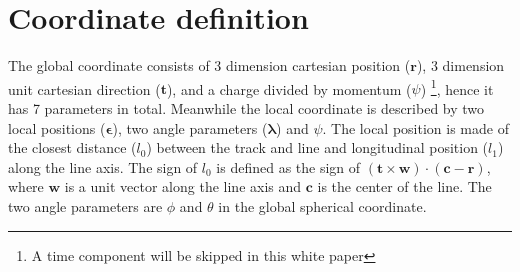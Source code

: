 \documentclass[12pt,a4paper]{scrarticle}
\begin{document}
\maketitle

\begin{abstract}
    
\end{abstract}

\newcommand{\jacobianLocalToGlobal}{\mathbb{J}_{L \rightarrow G}}
\newcommand{\jacobianGlobalToLocal}{\mathbb{J}_{G \rightarrow L}}

\newcommand{\pos}{\mathbf{r}}
\newcommand{\dir}{\mathbf{t}}
\newcommand{\qop}{\psi}

\newcommand{\local}{\boldsymbol{\epsilon}}
\newcommand{\sphAngle}{\boldsymbol{\lambda}}
\newcommand{\surfaceCenter}{\mathbf{c}}
\newcommand{\surfaceNormal}{\mathbf{w}}
\newcommand{\ubasis}{\mathbf{u}}
\newcommand{\vbasis}{\mathbf{v}}
\newcommand{\ulocal}{l_0}
\newcommand{\vlocal}{l_1}

\newcommand{\identityMatrix}{\mathbf{I}}
\newcommand{\zeroMatrix}{\mathbb{O}}

\tableofcontents

\section{Coordinate definition}
 The global coordinate consists of 3 dimension cartesian position ($\pos$), 3 dimension unit cartesian direction ($\dir$), and a charge divided by momentum ($\qop$) \footnote{A time component will be skipped in this white paper}, hence it has 7 parameters in total. Meanwhile the local coordinate is described by two local positions ($\local$), two angle parameters ($\sphAngle$) and $\qop$. The local position is made of the closest distance ($l_0$) between the track and line and longitudinal position ($l_1$) along the line axis. The sign of $l_0$ is defined as the sign of $ (\dir \times \surfaceNormal) \cdot (\surfaceCenter - \pos)$, where $\surfaceNormal$ is a unit vector along the line axis and $\surfaceCenter$ is the center of the line. The two angle parameters are $\phi$ and $\theta$ in the global spherical coordinate.
\end{document}
